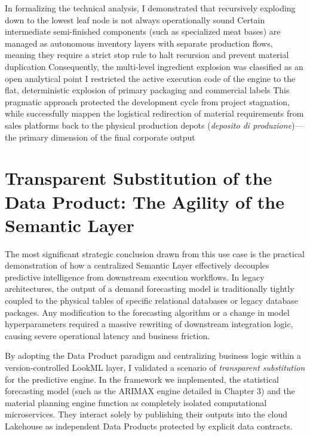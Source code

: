 In formalizing the technical analysis, I demonstrated that recursively exploding down to the lowest leaf node is not always operationally sound %
Certain intermediate semi-finished components (such as specialized meat bases) are managed as autonomous inventory layers with separate production flows, meaning they require a strict stop rule to halt recursion and prevent material duplication %
Consequently, the multi-level ingredient explosion was classified as an open analytical point %
I restricted the active execution code of the engine to the flat, deterministic explosion of primary packaging and commercial labels %
This pragmatic approach protected the development cycle from project stagnation, while successfully mappen the logistical redirection of material requirements from sales platforms back to the physical production depots (\textit{deposito di produzione})—the primary dimension of the final corporate output %

\section[Transparent Substitution of the Data Product]{Transparent Substitution of the Data Product: The Agility of the Semantic Layer}

The most significant strategic conclusion drawn from this use case is the practical demonstration of how a centralized Semantic Layer effectively decouples predictive intelligence from downstream execution workflows. In legacy architectures, the output of a demand forecasting model is traditionally tightly coupled to the physical tables of specific relational databases or legacy database packages. Any modification to the forecasting algorithm or a change in model hyperparameters required a massive rewriting of downstream integration logic, causing severe operational latency and business friction.

By adopting the Data Product paradigm and centralizing business logic within a version-controlled LookML layer, I validated a scenario of \textit{transparent substitution} for the predictive engine. In the framework we implemented, the statistical forecasting model (such as the ARIMAX engine detailed in Chapter 3) and the material planning engine function as completely isolated computational microservices. They interact solely by publishing their outputs into the cloud Lakehouse as independent Data Products protected by explicit data contracts.

